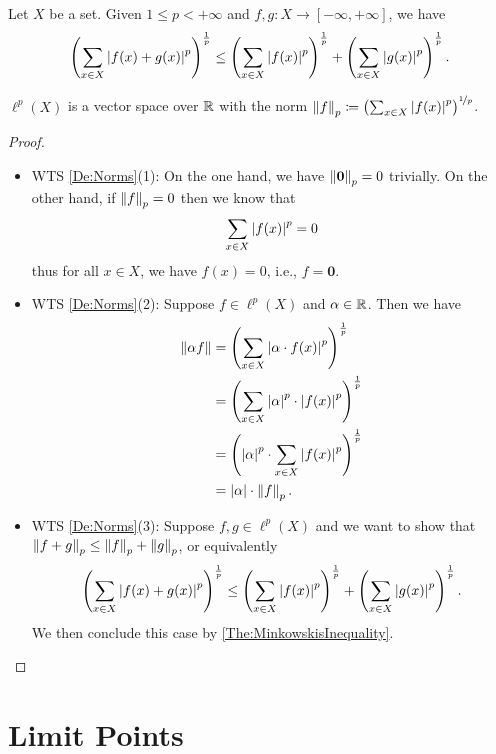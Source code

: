 \documentclass[screen]{techreport}
\numberwithin{equation}{section}
\begin{document}
\begin{theorem}\label{The:MinkowskisInequality}
	Let $X$ be a set.
	Given $1 \le p < +\infty$ and $f,g:X \to [-\infty,+\infty]$, we have
	\begin{equation*}
		\left({ \sum_{x \in X} \left|{f(x)+g(x)}\right|^p }\right)^{\frac{1}{p}} \le \left({ \sum_{x \in X} \left|{f(x)}\right|^p }\right)^{\frac{1}{p}} + \left({ \sum_{x \in X} \left|{g(x)}\right|^p }\right)^{\frac{1}{p}}.
	\end{equation*}
\end{theorem}

\begin{proposition}\label{Prop:lpVectorSpace}
	$\ell^p(X)$ is a vector space over $\mathbb{R}$ with the norm $\left\|{f}\right\|_p \coloneqq  \left({\sum_{x \in X} \left|{f(x)}\right|^p}\right)^{\nicefrac{1}{p}}$.
\end{proposition}
\begin{proof}\
	\begin{itemize}
		\item WTS \cref{De:Norms}(1):
		On the one hand, we have $\left\|{\mathbf{0}}\right\|_p = 0$ trivially.
		On the other hand, if $\left\|{f}\right\|_p = 0$ then we know that
		\[
		\sum_{x \in X} \left|{f(x)}\right|^p = 0
		\]
		thus for all $x \in X$, we have $f(x) = 0$, i.e., $f = \mathbf{0}$.
		
		\item WTS \cref{De:Norms}(2): Suppose $f \in \ell^p(X)$ and $\alpha \in \mathbb{R}$.
		Then we have
		\begin{align*}
			\left\|{\alpha f}\right\| & = \left({\sum_{x \in X} \left|{\alpha \cdot f(x)}\right|^p}\right)^{\frac{1}{p}} \\
			& = \left({ \sum_{x \in X} \left|{\alpha}\right|^p \cdot \left|{f(x)}\right|^p}\right)^\frac{1}{p} \\
			& = \left({ \left|{\alpha}\right|^p \cdot \sum_{x \in X} \left|{f(x)}\right|^p }\right)^\frac{1}{p} \\
			& = \left|{\alpha}\right| \cdot \left\|{f}\right\|_p.
		\end{align*}
		
		\item WTS \cref{De:Norms}(3): Suppose $f,g \in \ell^p(X)$ and we want to show that $\left\|{f+g}\right\|_p \le \left\|{f}\right\|_p+\left\|{g}\right\|_p$, or equivalently
		\[
		\left({ \sum_{x \in X} \left|{f(x) + g(x)}\right|^p }\right)^\frac{1}{p} \le \left({ \sum_{x \in X} \left|{f(x)}\right|^p}\right)^\frac{1}{p} + \left({ \sum_{x \in X} \left|{g(x)}\right|^p}\right)^\frac{1}{p}.
		\]
		We then conclude this case by \cref{The:MinkowskisInequality}.
	\end{itemize}
\end{proof}

\section{Limit Points}
\end{document}
